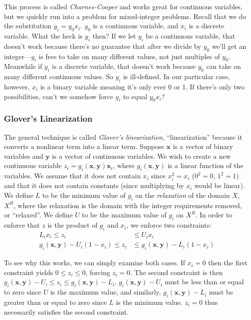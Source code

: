 \documentclass[11pt, oneside]{article}
\theoremstyle{plain}
\theoremstyle{definition}
\begin{document}
This process is called \textit{Charnes-Cooper} and works great for continuous
variables, but we quickly run into a problem for mixed-integer problems.
Recall that we do the substitution \( y_i = y_0 x_i \). \( y_0 \) is a
continuous variable, and \( x_i \) is a discrete variable. What the heck is
\( y_i \) then? If we let \( y_i \) be a continuous variable, that doesn't
work because there's no guarantee that after we divide by \( y_0 \) we'll
get an integer---\( y_i \) is free to take on many different values, not
just multiples of \( y_0 \). Meanwhile if \( y_i \) is a discrete variable,
that doesn't work because \( y_0 \) can take on many different continuous
values. So \( y_i \) is ill-defined. In our particular case, however, \( x_i
\) is a binary variable meaning it's only ever 0 or 1. If there's only two
possibilities, can't we somehow force \( y_i \) to equal \( y_0 x_i \)?

\subsubsection{Glover's Linearization}
The general technique is called \textit{Glover's linearization},
\enquote{linearization} because it converts a nonlinear term into a linear
term. Suppose \( \bm{x} \) is a vector of binary variables and \( \bm{y}
\) is a vector of continuous variables. We wish to create a new continuous
variable \( z_i = g_i(\bm{x}, \bm{y}) \bm{x}_i \), where \( g_i(\bm{x},
\bm{y}) \) is a linear function of the variables. We assume that it does not
contain \( x_i \) since \( x_i^2 = x_i \) (\( 0^2 = 0 \), \( 1^2 = 1\)) and
that it does not contain constants (since multiplying by \( x_i \) would
be linear). We define \( L \) to be the minimum value of \( g_i \) on the
\textit{relaxation} of the domain \( X \), \( X^R \), where the relaxation
is the domain with the integer requirements removed, or \enquote{relaxed}.
We define \( U \) to be the maximum value of \( g_i \) on \( X^R \).
In order to enforce that \( z \) is the product of \( g_i \) and \( x_i \),
we enforce two constraints:
\begin{align}
  L_i x_i \leq z_i &\leq U_i x_i      \label{eq:cond1} \\ 
  g_i(\bm{x}, \bm{y}) - U_i (1 - x_i) \leq z_i &\leq 
  g_i(\bm{x}, \bm{y}) - L_i (1 - x_i) \label{eq:cond2} 
\end{align}

To see why this works, we can simply examine both cases. If \( x_i = 0
\) then the first constraint yields \( 0 \leq z_i \leq 0 \), forcing \(
z_i = 0 \). The second constraint is then \( g_i(\bm{x}, \bm{y}) - U_i
\leq z_i \leq g_i(\bm{x}, \bm{y}) - L_i \). \( g_i(\bm{x}, \bm{y}) -
U_i \) must be less than or equal to zero since \( U \) is the maximum
value, and similarly, \( g_i(\bm{x}, \bm{y}) - L_i \) must be greater
than or equal to zero since \( L \) is the minimum value. \( z_i = 0 \)
thus necessarily satisfies the second constraint.
\end{document}
